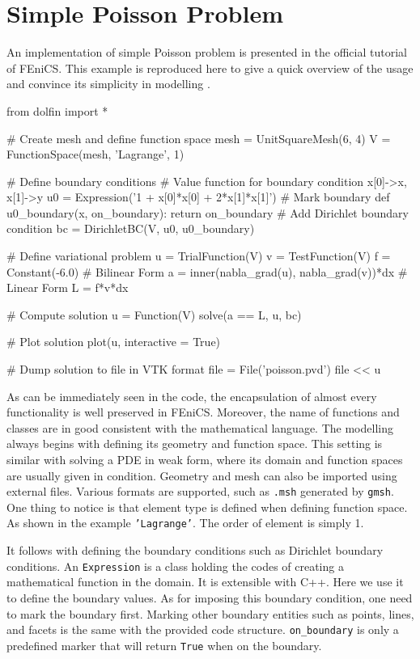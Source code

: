 \documentclass[10pt,a4paper]{scrreprt}
\begin{document}
\section{Simple Poisson Problem}
An implementation of simple Poisson problem is presented in the official tutorial of FEniCS. This example is reproduced here to give a quick overview of the usage and convince its simplicity in modelling \citep{wells2012automated}.

\begin{python}
from dolfin import *

# Create mesh and define function space
mesh = UnitSquareMesh(6, 4)
V = FunctionSpace(mesh, 'Lagrange', 1)

# Define boundary conditions
# Value function for boundary condition x[0]->x, x[1]->y
u0 = Expression('1 + x[0]*x[0] + 2*x[1]*x[1]')
# Mark boundary
def u0_boundary(x, on_boundary):
    return on_boundary
# Add Dirichlet boundary condition
bc = DirichletBC(V, u0, u0_boundary)

# Define variational problem
u = TrialFunction(V)
v = TestFunction(V)
f = Constant(-6.0)
# Bilinear Form
a = inner(nabla_grad(u), nabla_grad(v))*dx
# Linear Form
L = f*v*dx

# Compute solution
u = Function(V)
solve(a == L, u, bc)

# Plot solution
plot(u, interactive = True)

# Dump solution to file in VTK format
file = File('poisson.pvd')
file << u
\end{python}

As can be immediately seen in the code, the encapsulation of almost every functionality is well preserved in FEniCS. Moreover, the name of functions and classes are in good consistent with the mathematical language. The modelling always begins with defining its geometry and function space. This setting is similar with solving a PDE in weak form, where its domain and function spaces are usually given in condition. Geometry and mesh can also be imported using external files. Various formats are supported, such as \texttt{.msh} generated by \texttt{gmsh}. One thing to notice is that element type is defined when defining function space. As shown in the example \texttt{'Lagrange’}. The order of element is simply 1.

It follows with defining the boundary conditions such as Dirichlet boundary conditions. An \texttt{Expression} is a class holding the codes of creating a mathematical function in the domain. It is extensible with C++. Here we use it to define the boundary values. As for imposing this boundary condition, one need to mark the boundary first. Marking other boundary entities such as points, lines, and facets is the same with the provided code structure. \texttt{on\_boundary} is only a predefined marker that will return \texttt{True} when on the boundary.
\end{document}
